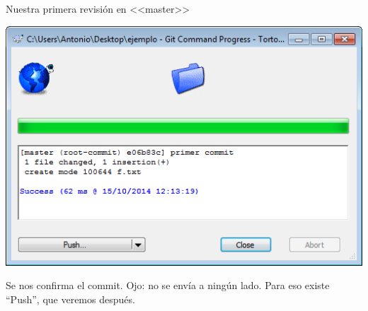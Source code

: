 \documentclass[xcolor=svgnames]{beamer}
\begin{document}
\begin{frame}[t]{Nuestra primera revisión en <<master>>}
\begin{overprint}
    \begin{center}
      \includegraphics[width=\textwidth,height=.6\textheight,keepaspectratio]{tomas/primercommit-05-okcommit}

      \vfill

      Se nos confirma el commit. \alert{Ojo}: no se envía a ningún lado. Para eso existe ``Push'', que veremos después.
    \end{center}
  \end{overprint}

\end{frame}
\end{document}

